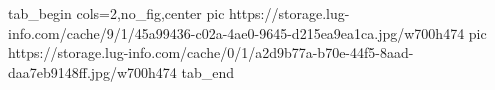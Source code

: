  
 
 
 
 

\ifcmt
  tab_begin cols=2,no_fig,center
		 pic https://storage.lug-info.com/cache/9/1/45a99436-c02a-4ae0-9645-d215ea9ea1ca.jpg/w700h474%
		 pic https://storage.lug-info.com/cache/0/1/a2d9b77a-b70e-44f5-8aad-daa7eb9148ff.jpg/w700h474%
  tab_end
\fi
